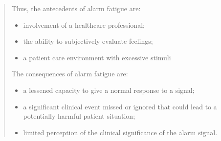 \begin{quotation}
	Thus, the antecedents of alarm fatigue are:
	\begin{itemize}
		\item involvement of a healthcare professional;
		\item the ability to subjectively evaluate feelings;
		\item a patient care environment with excessive stimuli
	\end{itemize}
	The consequences of alarm fatigue are:
	\begin{itemize}
		\item a lessened capacity to give a normal response to a signal;
		\item a significant clinical event missed or ignored that could lead to a potentially harmful patient situation;
		\item limited perception of the clinical significance of the alarm signal. \\
	\end{itemize}
\end{quotation}
